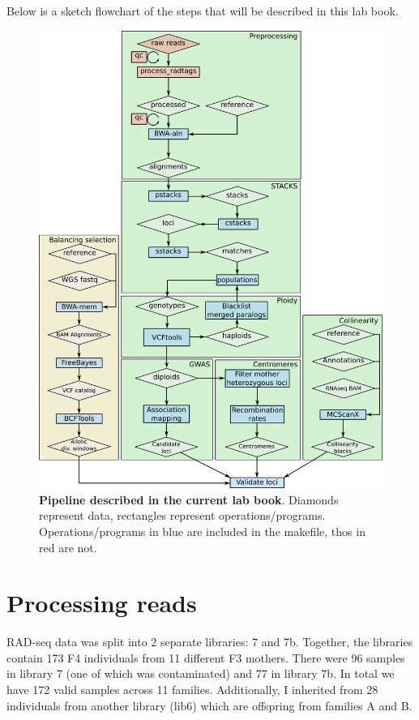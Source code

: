 \documentclass[10pt,a4paper]{report}
\begin{document}
Below is a sketch flowchart of the steps that will be described in this lab book. 
\begin{figure}
\includegraphics[scale=0.5]{flowchart}
\caption{\textbf{Pipeline described in the current lab book}. Diamonds represent data, rectangles represent operations/programs. Operations/programs in blue are included in the makefile, thos in red are not.}
\end{figure}

 \chapter{Processing reads}
 RAD-seq data was split into 2 separate libraries: 7 and 7b. Together, the libraries contain 173 F4 individuals from 11 different F3 mothers. There were 96 samples in library 7 (one of which was contaminated) and 77 in library 7b. In total we have 172 valid samples across 11 families. Additionally, I inherited from 28 individuals from another library (lib6) which are offspring from families A and B.
\end{document}

